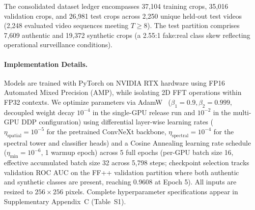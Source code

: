 \documentclass[10pt,twocolumn,letterpaper]{article}
\begin{document}
The consolidated dataset ledger encompasses 37,104 training crops, 35,016 validation crops, and 26,981 test crops across 2,250 unique held-out test videos (2,248 evaluated video sequences meeting $T \ge 8$). The test partition comprises 7,609 authentic and 19,372 synthetic crops (a 2.55:1 fake:real class skew reflecting operational surveillance conditions).

\paragraph{Implementation Details.}
Models are trained with PyTorch on NVIDIA RTX hardware using FP16 Automated Mixed Precision (AMP), while isolating 2D FFT operations within FP32 contexts. We optimize parameters via AdamW~\cite{loshchilov2019decoupled} ($\beta_1=0.9, \beta_2=0.999$, decoupled weight decay $10^{-4}$ in the single-GPU release run and $10^{-2}$ in the multi-GPU DDP configuration) using differential layer-wise learning rates ($\eta_{\mathrm{spatial}}=10^{-5}$ for the pretrained ConvNeXt backbone, $\eta_{\mathrm{spectral}}=10^{-4}$ for the spectral tower and classifier heads) and a Cosine Annealing learning rate schedule ($\eta_{\min}=10^{-6}$, 1 warmup epoch) across 5 full epochs (per-GPU batch size 16, effective accumulated batch size 32 across 5,798 steps; checkpoint selection tracks validation ROC AUC on the FF++ validation partition where both authentic and synthetic classes are present, reaching 0.9608 at Epoch 5). All inputs are resized to $256 \times 256$ pixels. Complete hyperparameter specifications appear in Supplementary Appendix~C (Table~S1).
\end{document}
